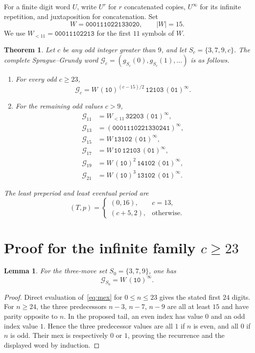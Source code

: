 \documentclass[10pt,a4paper]{article}
\newtheorem{theorem}{Theorem}
\newtheorem{lemma}{Lemma}
\newcommand{\SG}{\mathcal{G}}
\newcommand{\word}[1]{\mathtt{#1}}
\begin{document}
For a finite digit word $U$, write $U^r$ for $r$ concatenated copies, $U^\infty$ for its infinite repetition, and juxtaposition for concatenation. Set
\[ W=\word{000111022133020},\qquad |W|=15.\]
We use $W_{<11}=\word{00011102213}$ for the first $11$ symbols of $W$.

\begin{theorem}\label{thm:main}
Let $c$ be any odd integer greater than $9$, and let $S_c=\{3,7,9,c\}$. The complete Sprague--Grundy word $\SG_c=(g_{S_c}(0),g_{S_c}(1),\ldots)$ is as follows.
\begin{enumerate}[label=(\roman*)]
\item For every odd $c\ge23$,
\begin{equation}\label{eq:word}
\SG_c=W\,(\word{10})^{(c-15)/2}\,\word{12103}\,(\word{01})^\infty.
\end{equation}
\item For the remaining odd values $c>9$,
\begin{align*}
\SG_{11}&=W_{<11}\,\word{32203}\,(\word{01})^\infty,\\
\SG_{13}&=(\word{0001110221330241})^\infty,\\
\SG_{15}&=W\,\word{13102}\,(\word{01})^\infty,\\
\SG_{17}&=W\,\word{10}\,\word{12103}\,(\word{01})^\infty,\\
\SG_{19}&=W\,(\word{10})^{2}\,\word{14102}\,(\word{01})^\infty,\\
\SG_{21}&=W\,(\word{10})^{3}\,\word{13102}\,(\word{01})^\infty.
\end{align*}
\end{enumerate}
The \emph{least} preperiod and least eventual period are
\begin{equation}\label{eq:T-p}
(T,p)=\begin{cases}(0,16),&c=13,\\(c+5,2),&\text{otherwise}.\end{cases}
\end{equation}
\end{theorem}

\section{Proof for the infinite family $c\ge23$}
\begin{lemma}\label{lem:base}
For the three-move set $S_0=\{3,7,9\}$, one has
\[ \SG_{S_0}=W\,(\word{10})^\infty.\]
\end{lemma}
\begin{proof}
Direct evaluation of~\eqref{eq:mex} for $0\le n\le23$ gives the stated first $24$ digits. For $n\ge24$, the three predecessors $n-3$, $n-7$, $n-9$ are all at least $15$ and have parity opposite to $n$. In the proposed tail, an even index has value $0$ and an odd index value $1$. Hence the three predecessor values are all $1$ if $n$ is even, and all $0$ if $n$ is odd. Their mex is respectively $0$ or $1$, proving the recurrence and the displayed word by induction.
\end{proof}
\end{document}
